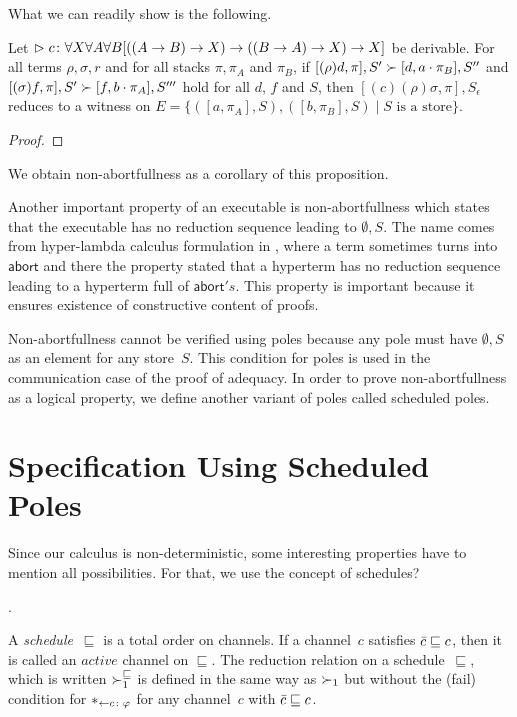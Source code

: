 What we can readily show is the following.
\begin{proposition}
 Let
 $\vartriangleright{c} \colon{\forall X\forall A\forall B
 [((A\rightarrow B)\rightarrow X)
  \rightarrow((B\rightarrow A)\rightarrow X)
  \rightarrow X]}$
 be
 derivable.
 For all terms $\rho,\sigma, r$ and for all stacks $\pi, \pi_A$ and
 $\pi_B$,
 if $[(\rho)d  ,\pi], S'\succ [d,a\cdot \pi_B], S''$ and
    $[(\sigma)f,\pi], S'\succ [f,b\cdot \pi_A], S'''$ hold for all $d$,
 $f$ and $S$,
 then
 $[(c)(\rho)\sigma,\pi],S_\epsilon$ reduces to a witness on
 $E = \{([a,\pi_A],S),([b,\pi_B],S)\mid S \text{ is a store}\}$.
\end{proposition}
\begin{proof}
\end{proof}
We obtain non-abortfullness as a corollary of this proposition.

Another important property of an executable is
non-abortfullness
which states that the executable has no reduction sequence leading to
$\emptyset,S$.
The name comes from hyper-lambda calculus formulation in ,
where a term sometimes turns into $\mathsf{abort}$ and there the property
stated that a hyperterm has no reduction sequence leading to a hyperterm
full of $\mathsf{abort}'s$.
This property is important because it ensures existence of
constructive content of proofs.

Non-abortfullness cannot be verified using poles
because any pole must have $\emptyset,S$ as an element for
any store~$S$.
This condition for poles is used in the
communication case of the proof of adequacy.
In order to prove non-abortfullness as a logical property,
we define another variant of poles called scheduled poles.


\section{Specification Using Scheduled Poles}

Since our calculus is non-deterministic,
some interesting properties have to mention
all possibilities.
For that, we use the concept of schedules?

.


\newcommand{\sche}{\sqsubseteq}
A \textit{schedule}~$\sche$ is a total order on channels.
If a channel~$c$ satisfies $\co c\sche c$, then it is called
an $\textit{active}$ channel on $\sche$.
The reduction relation on a schedule~$\sche$, which is written
$\red^\sche$ is defined in the same way as $\succ_1$ but without the
(fail) condition for $\ast_{\leftarrow{c\colon {\varphi}}}$ for any channel~$c$ with $\co c
\sche c$.

